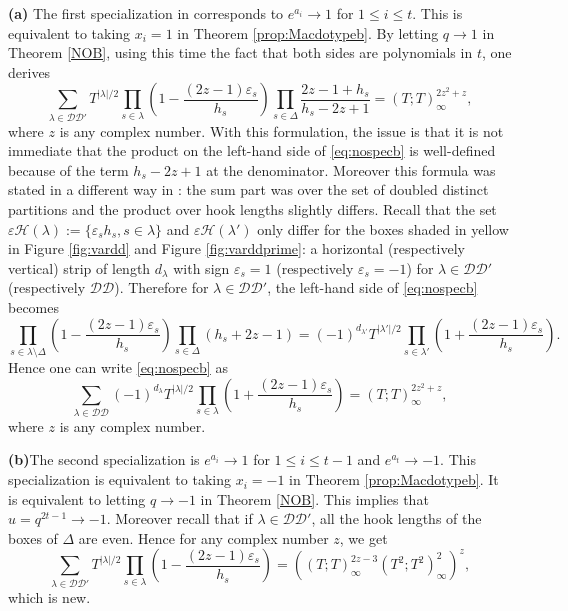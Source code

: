 \documentclass[11pt,letterpaper]{amsart}
\def\cch{\mathcal H}
\def\ccdd{\mathcal {DD}}
\numberwithin{equation}{section}
\numberwithin{df}{section}
\begin{document}
\textbf{(a)} The first specialization in \cite{Mac} corresponds to $e^{a_i}\to 1$ for $1\leq i\leq t$. This is equivalent to taking $x_i=1$ in Theorem \ref{prop:Macdotypeb}. By letting $q\rightarrow 1$ in Theorem \ref{NOB}, using this time the fact that both sides are polynomials in $t$, one derives 
\begin{equation}\label{eq:nospecb}
\sum_{\lambda\in\ccdd'}T^{\lvert \lambda\rvert/2}\prod_{s\in\lambda}\left(1-\frac{(2z-1)\varepsilon_s}{h_s}\right)\prod_{s\in\Delta}\frac{2z-1+h_s}{h_s-2z+1}=\left(T;T\right)_{\infty}^{2z^2+z},
\end{equation}
where $z$ is any complex number. With this formulation, the issue is that it is not immediate that the product on the left-hand side of \eqref{eq:nospecb} is well-defined because of the term $h_s-2z+1$ at the denominator. Moreover this formula was stated in a different way in \cite[Theorem $3.20$]{MP}: the sum part was over the set of doubled distinct partitions and the product over hook lengths slightly differs. Recall that the set $\varepsilon\cch(\lambda):=\lbrace \varepsilon_s h_s, s\in \lambda\rbrace$ and $\varepsilon\cch(\lambda')$ only differ for the boxes shaded in yellow in Figure \ref{fig:vardd} and Figure \ref{fig:varddprime}: a horizontal (respectively vertical) strip of length $d_\lambda$ with sign $\varepsilon_s=1$ (respectively $\varepsilon_s=-1$) for $\lambda\in\ccdd'$ (respectively $\ccdd$). Therefore for $\lambda\in\ccdd'$, the left-hand side of \eqref{eq:nospecb} becomes
$$\prod_{s\in\lambda\setminus \Delta}\left(1-\frac{(2z-1)\varepsilon_s}{h_s}\right)\prod_{s\in\Delta}(h_s+2z-1)=(-1)^{d_{\lambda'}}T^{\lvert \lambda'\rvert/2}\prod_{s\in\lambda'}\left(1+\frac{(2z-1)\varepsilon_s}{h_s}\right).$$
Hence one can write \eqref{eq:nospecb} as \cite[Theorem $3.20$]{MP}
\begin{equation}\label{eq:nospecbmatthias}
\sum_{\lambda\in\ccdd}(-1)^{d_\lambda}T^{\lvert \lambda\rvert/2}\prod_{s\in\lambda}\left(1+\frac{(2z-1)\varepsilon_s}{h_s}\right)=\left(T;T\right)_{\infty}^{2z^2+z},
\end{equation}
where $z$ is any complex number.


\textbf{(b)}The second specialization is $e^{a_i}\to 1$ for $1\leq i\leq t-1$ and $e^{a_t}\to -1$.
This specialization is equivalent to taking $x_i=-1$ in Theorem \ref{prop:Macdotypeb}. It is equivalent to letting $q\to -1$ in Theorem \ref{NOB}. This implies that $u=q^{2t-1}\to -1$. Moreover recall that if $\lambda\in\ccdd'$, all the hook lengths of the boxes of $\Delta$ are even. Hence for any complex number $z$, we get
\begin{equation}\label{eq:nospecbmoinsun}
\sum_{\lambda\in\ccdd'}T^{\lvert \lambda\rvert/2}\prod_{s\in\lambda}\left(1-\frac{(2z-1)\varepsilon_s}{h_s}\right)=\left(\left(T;T\right)_{\infty}^{2z-3}\left(T^2;T^2\right)_{\infty}^{2}\right)^z,
\end{equation}
which is new.
\end{document}

